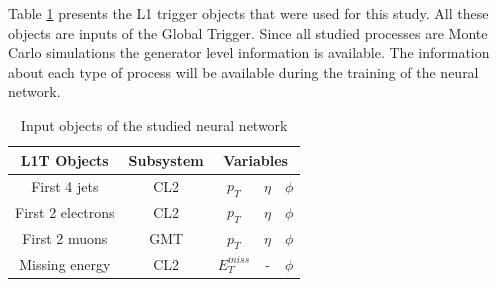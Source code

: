 \documentclass[../../main.tex]{subfiles}
\begin{document}
Table \ref{tab:Input_obj} presents the L1 trigger objects that were used for this study.
All these objects are inputs of the Global Trigger. Since all studied processes are Monte Carlo simulations the generator level information is available. The information about each type of process will be available during the training of the neural network.

\begin{center}
    \begin{table}[h]
    \centering
    \begin{tabular}{|c|c|c|c|c|}
        \hline
        L1T Objects & Subsystem &\multicolumn{3}{c|}{Variables} \\
        \hline
        First 4 jets        & CL2 & $p_T$ & $\eta$   & \cellcolor{gray!25}$\phi$ \\
        First 2 electrons   & CL2 & $p_T$ & $\eta$   & \cellcolor{gray!25}$\phi$ \\
        First 2 muons       & GMT & $p_T$ & $\eta$   & \cellcolor{gray!25}$\phi$ \\
        Missing energy      & CL2 & $E_T^{miss}$ & - & \cellcolor{gray!25}$\phi$ \\
        \hline
    \end{tabular}
    \caption{Input objects of the studied neural network}
    \label{tab:Input_obj}
    \end{table}
\end{center}
\end{document}
